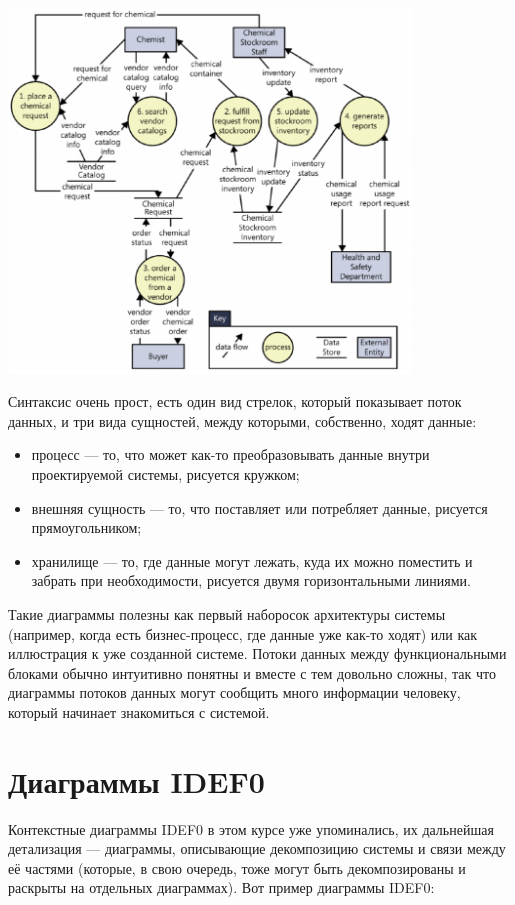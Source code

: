 \documentclass[a5paper]{article}
\begin{document}
\begin{center}
	\includegraphics[width=0.8\textwidth]{dfd.png}
\end{center}

Синтаксис очень прост, есть один вид стрелок, который показывает поток данных, и три вида сущностей, между которыми, собственно, ходят данные:

\begin{itemize}
	\item процесс --- то, что может как-то преобразовывать данные внутри проектируемой системы, рисуется кружком;
	\item внешняя сущность --- то, что поставляет или потребляет данные, рисуется прямоугольником;
	\item хранилище --- то, где данные могут лежать, куда их можно поместить и забрать при необходимости, рисуется двумя горизонтальными линиями.
\end{itemize}

Такие диаграммы полезны как первый наборосок архитектуры системы (например, когда есть бизнес-процесс, где данные уже как-то ходят) или как иллюстрация к уже созданной системе. Потоки данных между функциональными блоками обычно интуитивно понятны и вместе с тем довольно сложны, так что диаграммы потоков данных могут сообщить много информации человеку, который начинает знакомиться с системой.

\section{Диаграммы IDEF0}

Контекстные диаграммы IDEF0 в этом курсе уже упоминались, их дальнейшая детализация --- диаграммы, описывающие декомпозицию системы и связи между её частями (которые, в свою очередь, тоже могут быть декомпозированы и раскрыты на отдельных диаграммах). Вот пример диаграммы IDEF0:
\end{document}
